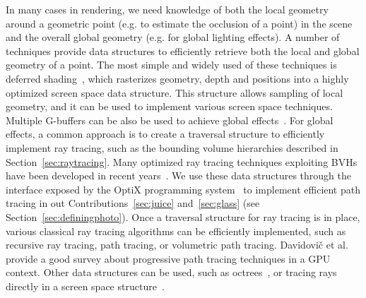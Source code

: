 In many cases in rendering, we need knowledge of both the local geometry around a geometric point (e.g. to estimate the occlusion of a point) in the scene and the overall global geometry (e.g. for global lighting effects). A number of techniques provide data structures to efficiently retrieve both the local and global geometry of a point. The most simple and widely used of these techniques is deferred shading~\cite{Saito1990}, which rasterizes geometry, depth and positions into a highly optimized screen space data structure. This structure allows sampling of local geometry, and it can be used to implement various screen space techniques. Multiple G-buffers can be also be used to achieve global effects~\cite{Mara2016}. For global effects, a common approach is to create a traversal structure to efficiently implement ray tracing, such as the bounding volume hierarchies described in Section~\ref{sec:raytracing}. Many optimized ray tracing techniques exploiting BVHs have been developed in recent years~\cite{Parker2010,Wald2014,Hendrich2017,Meister2018}. We use these data structures through the interface exposed by the OptiX programming system~\cite{Parker2010} to implement efficient path tracing in out Contributions~\ref{sec:juice} and~\ref{sec:glass} (see Section~\ref{sec:definingphoto}). Once a traversal structure for ray tracing is in place, various classical ray tracing algorithms can be efficiently implemented, such as recursive ray tracing, path tracing, or volumetric path tracing. Davidovi\v{c} et al.~\cite{Davidovic2014} provide a good survey about progressive path tracing techniques in a GPU context. Other data structures can be used, such as octrees~\cite{Glassner1988,Havran2000}, or tracing rays directly in a screen space structure~\cite{Tanaka1986,McGuire2014, Widmer2015}. 

